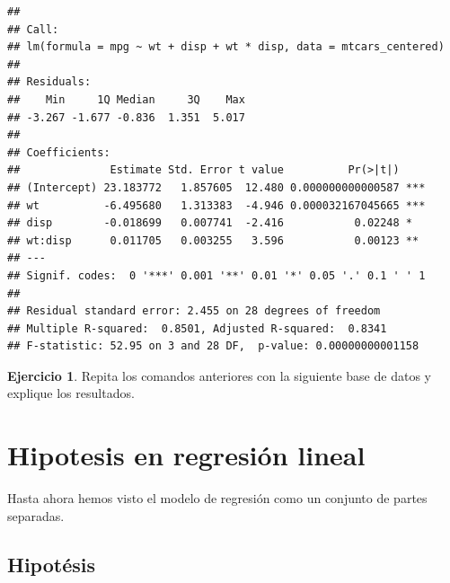 \documentclass[
  12pt,
]{book}
\newenvironment{Shaded}{\begin{snugshade}}{\end{snugshade}}
\newcommand{\DataTypeTok}[1]{\textcolor[rgb]{0.13,0.29,0.53}{#1}}
\newcommand{\KeywordTok}[1]{\textcolor[rgb]{0.13,0.29,0.53}{\textbf{#1}}}
\newcommand{\NormalTok}[1]{#1}
\newcommand{\OperatorTok}[1]{\textcolor[rgb]{0.81,0.36,0.00}{\textbf{#1}}}
\newcommand{\OtherTok}[1]{\textcolor[rgb]{0.56,0.35,0.01}{#1}}
\newcommand{\StringTok}[1]{\textcolor[rgb]{0.31,0.60,0.02}{#1}}
\theoremstyle{definition}
\theoremstyle{definition}
\theoremstyle{definition}
\newtheorem{exercise}{Ejercicio}[chapter]
\theoremstyle{remark}
\begin{document}
\begin{verbatim}
## 
## Call:
## lm(formula = mpg ~ wt + disp + wt * disp, data = mtcars_centered)
## 
## Residuals:
##    Min     1Q Median     3Q    Max 
## -3.267 -1.677 -0.836  1.351  5.017 
## 
## Coefficients:
##              Estimate Std. Error t value          Pr(>|t|)    
## (Intercept) 23.183772   1.857605  12.480 0.000000000000587 ***
## wt          -6.495680   1.313383  -4.946 0.000032167045665 ***
## disp        -0.018699   0.007741  -2.416           0.02248 *  
## wt:disp      0.011705   0.003255   3.596           0.00123 ** 
## ---
## Signif. codes:  0 '***' 0.001 '**' 0.01 '*' 0.05 '.' 0.1 ' ' 1
## 
## Residual standard error: 2.455 on 28 degrees of freedom
## Multiple R-squared:  0.8501, Adjusted R-squared:  0.8341 
## F-statistic: 52.95 on 3 and 28 DF,  p-value: 0.00000000001158
\end{verbatim}

\begin{exercise}

Repita los comandos anteriores con la siguiente base de datos y explique los resultados.

\begin{Shaded}
\end{Shaded}

\end{exercise}

\hypertarget{hipotesis-en-regresiuxf3n-lineal}{%
\section{Hipotesis en regresión lineal}\label{hipotesis-en-regresiuxf3n-lineal}}

Hasta ahora hemos visto el modelo de regresión como un conjunto de partes separadas.

\hypertarget{hipotuxe9sis}{%
\subsection{Hipotésis}\label{hipotuxe9sis}}
\end{document}
